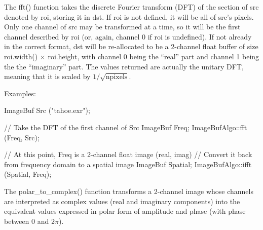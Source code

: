 \apiend

 
 

The {\cf fft()} function takes the discrete Fourier transform (DFT) of
the section of {\cf src} denoted by {\cf roi}, storing it in {\cf dst}.
If {\cf roi} is not defined, it will be all of {\cf src}'s pixels.  Only
one channel of {\cf src} may be transformed at a time, so it will be the
first channel described by {\cf roi} (or, again, channel 0 if {\cf roi}
is undefined).  If not already in the correct format, {\cf dst} will be
re-allocated to be a 2-channel {\cf float} buffer of size 
{\cf roi.width()} $\times$ {\cf roi.height}, with channel 0 being the
``real'' part and channel 1 being the the ``imaginary'' part.  The
values returned are actually the unitary DFT, meaning that it is scaled
by $1/\sqrt{\mathrm{npixels}}$.

\smallskip
\noindent Examples:
\begin{code}
    ImageBuf Src ("tahoe.exr");

    // Take the DFT of the first channel of Src
    ImageBuf Freq;
    ImageBufAlgo::fft (Freq, Src);

    // At this point, Freq is a 2-channel float image (real, imag)
    // Convert it back from frequency domain to a spatial image
    ImageBuf Spatial;
    ImageBufAlgo::ifft (Spatial, Freq);
\end{code}
\apiend

 
 

The {\cf polar_to_complex()} function transforms a 2-channel image whose
channels are interpreted as complex values (real and imaginary components)
into the equivalent values expressed in polar form of amplitude and phase
(with phase between $0$ and $2\pi$).

